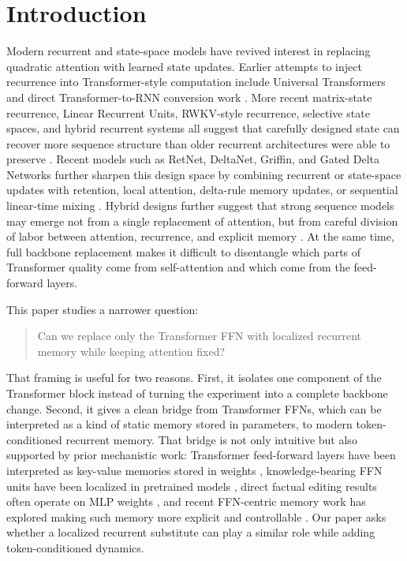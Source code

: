 \documentclass[11pt]{article}
\begin{document}
\section{Introduction}
Modern recurrent and state-space models have revived interest in replacing
quadratic attention with learned state updates. Earlier attempts to inject
recurrence into Transformer-style computation include Universal Transformers
and direct Transformer-to-RNN conversion work \citep{dehghani2019universal,
kasai2021t2r}. More recent matrix-state recurrence, Linear Recurrent Units,
RWKV-style recurrence, selective state spaces, and hybrid recurrent systems all
suggest that carefully designed state can recover more sequence structure than
older recurrent architectures were able to preserve
\citep{orvieto2023lru, rwkv2023, eaglefinch2024, mamba2023,
mamba2ssd2024, xlstm2024, m2rnn2026}. Recent models such as RetNet,
DeltaNet, Griffin, and Gated Delta Networks further sharpen this design space
by combining recurrent or state-space updates with retention, local attention,
delta-rule memory updates, or sequential linear-time mixing
\citep{retnet2023, yang2024deltanet, griffin2024, gateddeltanet2024}. Hybrid
designs further suggest that strong sequence models may emerge not from a
single replacement of attention, but from careful division of labor between
attention, recurrence, and explicit memory \citep{jamba2024, samba2024,
hymba2024}. At the same time, full backbone
replacement makes it difficult to disentangle which parts of Transformer
quality come from self-attention and which come from the feed-forward layers.

This paper studies a narrower question:
\begin{quote}
Can we replace only the Transformer FFN with localized recurrent memory while
keeping attention fixed?
\end{quote}
That framing is useful for two reasons. First, it isolates one component of the
Transformer block instead of turning the experiment into a complete backbone
change. Second, it gives a clean bridge from Transformer FFNs, which can be
interpreted as a kind of static memory stored in parameters, to modern
token-conditioned recurrent memory. That bridge is not only intuitive but also
supported by prior mechanistic work: Transformer feed-forward layers have been
interpreted as key-value memories stored in weights \citep{geva2020ffnmem},
knowledge-bearing FFN units have been localized in pretrained models
\citep{dai2021knowledge}, direct factual editing results often operate on MLP
weights \citep{meng2022rome}, and recent FFN-centric memory work has explored
making such memory more explicit and controllable \citep{memoryllmffn2026}.
Our paper asks whether a localized
recurrent substitute can play a similar role while adding token-conditioned
dynamics.
\end{document}
